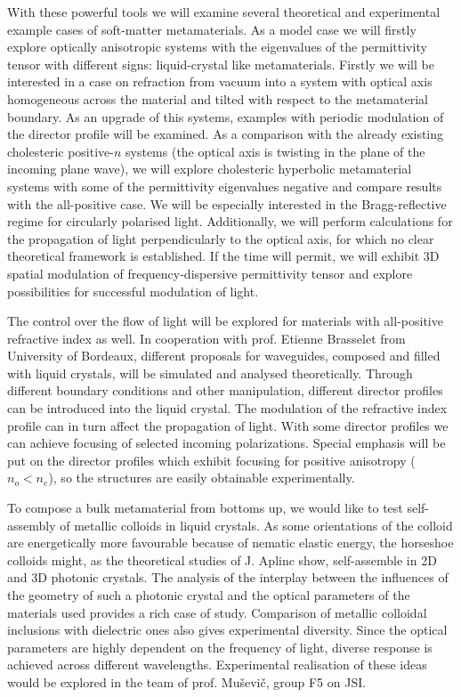 \documentclass[a4paper,11pt]{article}
\begin{document}

With these powerful tools we will examine several theoretical and experimental example cases of soft-matter metamaterials. 
As a model case we will firstly explore optically anisotropic systems with the eigenvalues of the permittivity tensor with different signs: liquid-crystal like metamaterials. 
Firstly we will be interested in a case on refraction from vacuum into a system with optical axis homogeneous across the material and tilted with respect to the metamaterial boundary. 
As an upgrade of this systems, examples with periodic modulation of the director profile will be examined. 
As a comparison with the already existing cholesteric positive-$n$ systems (the optical axis is twisting in the plane of the incoming plane wave), we will explore cholesteric hyperbolic metamaterial systems with some of the permittivity eigenvalues negative and compare results with the all-positive case. 
We will be especially interested in the Bragg-reflective regime for circularly polarised light. 
Additionally, we will perform calculations for the propagation of light perpendicularly to the optical axis, for which no clear theoretical framework is established. 
If the time will permit, we will exhibit 3D spatial modulation of frequency-dispersive permittivity tensor and explore possibilities for successful modulation of light.  


The control over the flow of light will be explored for materials with all-positive refractive index as well. 
In cooperation with prof. Etienne Brasselet from University of Bordeaux, different proposals for waveguides, composed and filled with liquid crystals, will be simulated and analysed theoretically. 
Through different boundary conditions and other manipulation, different director profiles can be introduced into the liquid crystal. 
The modulation of the refractive index profile can in turn affect the propagation of light. 
With some director profiles we can achieve focusing of selected incoming polarizations.
Special emphasis will be put on the director profiles which exhibit focusing for positive anisotropy ($n_{o} < n_e$), so the structures are easily obtainable experimentally. 


To compose a bulk metamaterial from bottoms up, we would like to test self-assembly of metallic colloids in liquid crystals.
As some orientations of the colloid are energetically more favourable because of nematic elastic energy, the horseshoe colloids might, as the theoretical studies of J. Aplinc \cite{jure-HS} show, self-assemble in 2D and 3D photonic crystals. 
The analysis of the interplay between the influences of the geometry of such a photonic crystal and the optical parameters of the materials used provides a rich case of study. 
Comparison of metallic colloidal inclusions with dielectric ones also gives experimental diversity. 
Since the optical parameters are highly dependent on the frequency of light, diverse response is achieved across different wavelengths. 
Experimental realisation of these ideas would be explored in the team of prof. Muševič, group F5 on JSI. 
\end{document}

